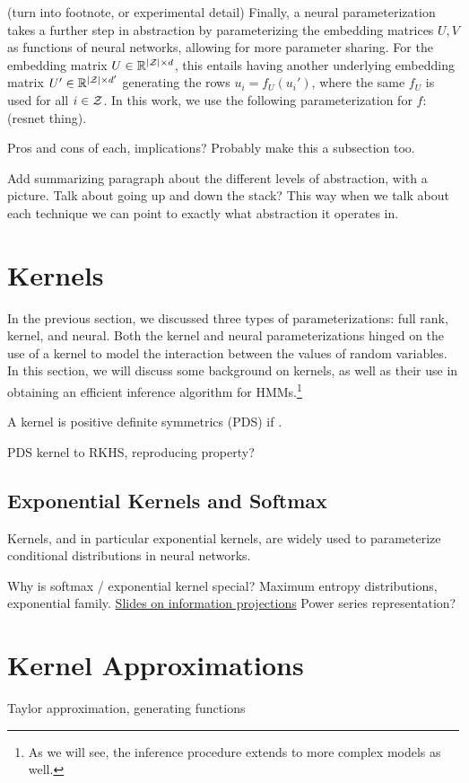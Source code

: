\documentclass{article}
\begin{document}
(turn into footnote, or experimental detail)
Finally, a neural parameterization takes a further step in abstraction by
parameterizing the embedding matrices $U,V$ as functions of neural networks,
allowing for more parameter sharing.
For the embedding matrix $U\in\mathbb{R}^{|\mathcal{Z}|\times d}$,
this entails having another underlying embedding matrix $U'\in\mathbb{R}^{|\mathcal{Z}| \times d'}$
generating the rows $u_i = f_U(u_i')$, where the same $f_U$ is used for all $i \in \mathcal{Z}$.
In this work, we use the following parameterization for $f$:
(resnet thing).

Pros and cons of each, implications?
Probably make this a subsection too.

Add summarizing paragraph about the different levels of abstraction, with a picture.
Talk about going up and down the stack?
This way when we talk about each technique we can point
to exactly what abstraction it operates in.

\section{Kernels}
In the previous section, we discussed three types of parameterizations: full rank,
kernel, and neural. Both the kernel and neural parameterizations hinged on the use of
a kernel to model the interaction between the values of random variables.
In this section, we will discuss some background on kernels, as well as
their use in obtaining an efficient inference algorithm for HMMs.\footnote{
As we will see, the inference procedure extends to more complex models as well.
}


A kernel is positive definite symmetrics (PDS) if .

PDS kernel to RKHS, reproducing property?


\subsection{Exponential Kernels and Softmax}
Kernels, and in particular exponential kernels, are widely used to parameterize 
conditional distributions in neural networks.


Why is softmax / exponential kernel special?
Maximum entropy distributions, exponential family.
\href{https://www.lix.polytechnique.fr/~nielsen/CIG-slides.pdf}{Slides on information projections}
Power series representation?

\section{Kernel Approximations}
Taylor approximation, generating functions
\end{document}
